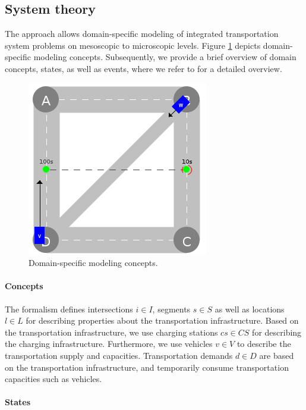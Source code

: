 \documentclass[a4paper,twoside]{article}
\begin{document}
	\subsection{System theory}
	\label{sec:domain-specific-modeling}
	
	The approach allows domain-specific modeling of integrated transportation system problems on mesoscopic to microscopic levels.
	Figure \ref{fig:domain-specific-modeling} depicts domain-specific modeling concepts.
	Subsequently, we provide a brief overview of domain concepts, states, as well as events, where we refer to \cite{ascher2023discrete} for a detailed overview.

	\begin{figure}[!ht]
		\centering
		\includegraphics[width=0.42\columnwidth]{./graphics/events/demand.png}
		\caption{Domain-specific modeling concepts.}
		\label{fig:domain-specific-modeling}
	\end{figure}
	
	\paragraph{Concepts}
	
	The formalism defines intersections $i \in I$, segments $s \in S$ as well as locations $l \in L$ for describing properties about the transportation infrastructure.
	Based on the transportation infrastructure, we use charging stations $cs \in CS$ for describing the charging infrastructure.
	Furthermore, we use vehicles $v \in V$ to describe the transportation supply and capacities.
	Transportation demands $d \in D$ are based on the transportation infrastructure, and temporarily consume transportation capacities such as vehicles.
	
	\paragraph{States}
	
\end{document}
